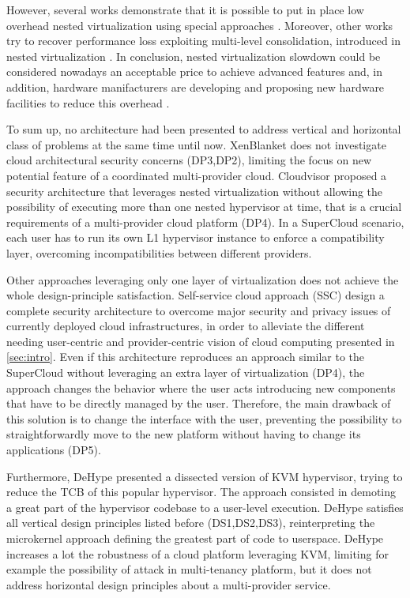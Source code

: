 \documentclass{sig-alternate}
\begin{document}
However, several works demonstrate that it is possible to put in place low overhead nested virtualization using special approaches \cite{turtle:ibm} . Moreover, other works try to recover performance loss exploiting multi-level consolidation, introduced in nested virtualization \cite{art:blan}. In conclusion, nested virtualization slowdown could be considered nowadays an acceptable price to achieve advanced features and, in addition, hardware manifacturers are developing and proposing new hardware facilities to reduce this overhead \cite{vmcs:nakajima}.

To sum up, no architecture had been presented to address vertical and horizontal class of problems at the same time until now. XenBlanket does not investigate cloud architectural security concerns (DP3,DP2), limiting the focus on new potential feature of a coordinated multi-provider cloud. Cloudvisor proposed a security architecture that leverages nested virtualization without allowing the possibility of executing more than one nested hypervisor at time, that is a crucial requirements of a multi-provider cloud platform (DP4). In a SuperCloud scenario, each user has to run its own L1 hypervisor instance to enforce a compatibility layer, overcoming incompatibilities between different providers.

Other approaches leveraging only one layer of virtualization does not achieve the whole design-principle satisfaction. Self-service cloud approach (SSC) \cite{ssc:art} design a complete security architecture to overcome major security and privacy issues of currently deployed cloud infrastructures, in order to alleviate the different needing user-centric and provider-centric vision of cloud computing presented in \ref{sec:intro}. Even if this architecture reproduces an approach similar to the SuperCloud without leveraging an extra layer of virtualization (DP4), the approach changes the behavior where the user acts introducing new components that have to be directly managed by the user. Therefore, the main drawback of this solution is to change the interface with the user, preventing the possibility to straightforwardly move to the new platform without having to change its applications (DP5).

Furthermore, DeHype \cite{wu2013TamHosHypMosDepExe} presented a dissected version of KVM hypervisor, trying to reduce the TCB of this popular hypervisor. The approach consisted in demoting a great part of the hypervisor codebase to a user-level execution. DeHype satisfies all vertical design principles listed before (DS1,DS2,DS3), reinterpreting the microkernel approach defining  the greatest part of code to userspace. DeHype increases a lot the robustness of a cloud platform leveraging KVM, limiting for example the possibility of attack in multi-tenancy platform, but it does not address horizontal design principles about a multi-provider service.
\end{document}
